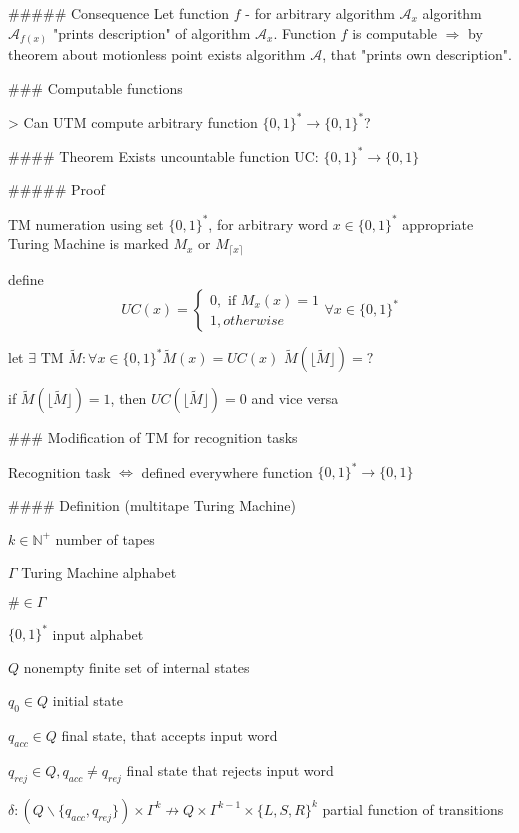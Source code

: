 \documentclass[12pt,letterpaper]{report}
\begin{document}
##### Consequence
Let function $f$ - for arbitrary algorithm $\mathcal{A}_x$ algorithm $\mathcal{A}_{f(x)}$ "prints description" of algorithm $\mathcal{A}_x$.
Function $f$ is computable $\Rightarrow$ by theorem about motionless point exists algorithm $\mathcal{A}$, that "prints own description".

### Computable functions

> Can UTM compute arbitrary function $\{0, 1\}^* \rightarrow \{0,1\}^*$?

#### Theorem
Exists uncountable function UC: $\{0,1\}^* \rightarrow \{0,1\}$

##### Proof
\item TM numeration using set $\{0,1\}^*$, for arbitrary word $x \in \{0,1\}^*$ appropriate Turing Machine is marked $M_x$ or $M_{\lceil x \rceil}$
\item define $$UC(x) = \begin{cases}
	0, \text{ if } M_x(x) = 1 \\
	1, otherwise
\end{cases} \forall x \in \{0,1\}^*
$$
\item let $\exists \text{ TM } \widetilde{M}: \forall x \in \{0,1\}^* \widetilde{M}(x) = UC(x)$
$\widetilde{M}(\lfloor\widetilde{M}\rfloor) = ?$
\item if $\widetilde{M}(\lfloor \widetilde{M} \rfloor) = 1$, then $UC(\lfloor \widetilde{M} \rfloor)=0$ and vice versa

### Modification of TM for recognition tasks

Recognition task $\Leftrightarrow$ defined everywhere function $\{0,1\}^* \rightarrow \{0,1\}$

#### Definition (multitape Turing Machine)
\item $k \in \mathbb{N}^+$ number of tapes
\item $\Gamma$ Turing Machine alphabet
\item $\# \in \Gamma$
\item $\{0,1\}^*$ input alphabet
\item $Q$ nonempty finite set of internal states
\item $q_0 \in Q$ initial state
\item $q_{acc} \in Q$ final state, that accepts input word
\item $q_{rej} \in Q, q_{acc} \not= q_{rej}$ final state that rejects input word
\item $\delta : (Q \backslash \{q_{acc}, q_{rej}\}) \times \Gamma^k \nrightarrow Q \times \Gamma^{k-1} \times \{L, S, R\}^k$ partial function of transitions
\end{document}
